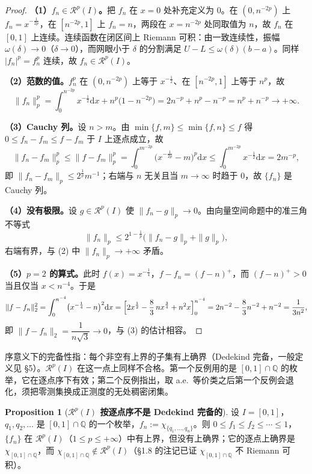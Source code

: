 \documentclass[oneside]{book}
\theoremstyle{definition}
\newcommand{\Rc}{\mathcal{R}}
\newcommand{\dd}{\mathrm{d}}
\providecommand{\Q}{\mathbb{Q}}
\theoremstyle{definition}
\newtheorem{proposition}{Proposition}[section]
\begin{document}
	\begin{proof}
		\textbf{（1）$f_n\in\Rc^p(I)$。}把 $f_n$ 在 $x=0$ 处补充定义为 $0$。在 $(0,n^{-2p})$ 上 $f_n=x^{-\frac1{2p}}$，在 $[n^{-2p},1]$ 上 $f_n=n$，两段在 $x=n^{-2p}$ 处同取值为 $n$，故 $f_n$ 在 $[0,1]$ 上连续。连续函数在闭区间上 Riemann 可积：由一致连续性，振幅 $\omega(\delta)\to0$（$\delta\to0$），而网眼小于 $\delta$ 的分割满足 $U-L\leqslant\omega(\delta)(b-a)$。同样 $|f_n|^p=f_n^p$ 连续，故 $f_n\in\Rc^p(I)$。
		
		\textbf{（2）范数的值。}$f_n^p$ 在 $(0,n^{-2p})$ 上等于 $x^{-\frac12}$、在 $[n^{-2p},1]$ 上等于 $n^p$，故
		\[
		\|f_n\|_p^p=\int_0^{n^{-2p}}x^{-\frac12}\dd x+n^p\bigl(1-n^{-2p}\bigr)=2n^{-p}+n^p-n^{-p}=n^p+n^{-p}\longrightarrow+\infty .
		\]
		
		\textbf{（3）Cauchy 列。}设 $n>m$。由 $\min\{f,m\}\leqslant\min\{f,n\}\leqslant f$ 得 $0\leqslant f_n-f_m\leqslant f-f_m$ 于 $I$ 上逐点成立，故
		\[
		\|f_n-f_m\|_p^p\leqslant\|f-f_m\|_p^p
		=\int_0^{m^{-2p}}\bigl(x^{-\frac1{2p}}-m\bigr)^p\dd x
		\leqslant\int_0^{m^{-2p}}x^{-\frac12}\dd x=2m^{-p},
		\]
		即 $\|f_n-f_m\|_p\leqslant2^{\frac1p}m^{-1}$；右端与 $n$ 无关且当 $m\to\infty$ 时趋于 $0$，故 $\{f_n\}$ 是 Cauchy 列。
		
		\textbf{（4）没有极限。}设 $g\in\Rc^p(I)$ 使 $\|f_n-g\|_p\to0$。由向量空间命题中的准三角不等式
		\[
		\|f_n\|_p\leqslant2^{1-\frac1p}\bigl(\|f_n-g\|_p+\|g\|_p\bigr),
		\]
		右端有界，与 (2) 中 $\|f_n\|_p\to+\infty$ 矛盾。
		
		\textbf{（5）$p=2$ 的算式。}此时 $f(x)=x^{-\frac14}$，$f-f_n=(f-n)^+$，而 $(f-n)^+>0$ 当且仅当 $x<n^{-4}$。于是
		\[
		\|f-f_n\|_2^2=\int_0^{n^{-4}}\bigl(x^{-\frac14}-n\bigr)^2\dd x
		=\Bigl[2x^{\frac12}-\frac83\,nx^{\frac34}+n^2x\Bigr]_0^{n^{-4}}
		=2n^{-2}-\frac83n^{-2}+n^{-2}=\frac1{3n^2},
		\]
		即 $\|f-f_n\|_2=\dfrac1{n\sqrt3}\to0$，与 (3) 的估计相容。
	\end{proof}
	
	序意义下的完备性指：每个非空有上界的子集有上确界（Dedekind 完备，一般定义见 §5）。$\Rc^p(I)$ 在这一点上同样不合格。第一个反例用的是 $[0,1]\cap\Q$ 的枚举，它在逐点序下有效；第二个反例指出，取 a.e.\ 等价类之后第一个反例会退化，须把零测集换成正测度的无处稠密闭集。
	
	\begin{proposition}[\bfseries{$\Rc^p(I)$ 按逐点序不是 Dedekind 完备的}]
		设 $I=[0,1]$，$q_1,q_2,\dots$ 是 $[0,1]\cap\Q$ 的一个枚举，$f_n:=\chi_{\{q_1,\dots,q_n\}}$。则 $0\leqslant f_1\leqslant f_2\leqslant\cdots\leqslant1$，$\{f_n\}$ 在 $\Rc^p(I)$（$1\leqslant p\leqslant+\infty$）中有上界，但没有上确界；它的逐点上确界是 $\chi_{[0,1]\cap\Q}$，而 $\chi_{[0,1]\cap\Q}\notin\Rc^p(I)$（§1.8 的注记已证 $\chi_{[0,1]\cap\Q}$ 不 Riemann 可积）。
	\end{proposition}
	
\end{document}
